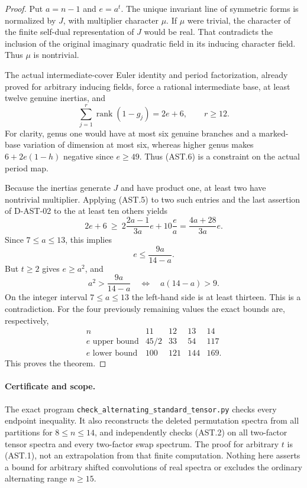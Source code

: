 \begin{proof}
Put $a=n-1$ and $e=a^t$.  The unique invariant line of
symmetric forms is normalized by $J$, with multiplier
character $\mu$.  If $\mu$ were trivial, the character of
the finite self-dual representation of $J$ would be real.
That contradicts the inclusion of the original imaginary
quadratic field in its inducing character field.  Thus
$\mu$ is nontrivial.

The actual intermediate-cover Euler identity and period
factorization, already proved for arbitrary inducing fields,
force a rational intermediate base, at least twelve genuine
inertias, and
\[
                 \sum_{j=1}^r\operatorname{rank}(1-g_j)
                           =2e+6,\qquad r\ge12.             \tag{AST.6}
\]
For clarity, genus one would have at most six genuine
branches and a marked-base variation of dimension at most
six, whereas higher genus makes
$6+2e(1-h)$ negative since $e\ge49$.  Thus (AST.6) is a
constraint on the actual period map.

Because the inertias generate $J$ and have product one,
at least two have nontrivial multiplier.  Applying (AST.5)
to two such entries and the last assertion of D-AST-02
to the at least ten others yields
\[
 2e+6\ \ge\ 2\frac{2a-1}{3a}e+10\frac ea
             =\frac{4a+28}{3a}e.
\]
Since $7\le a\le13$, this implies
\[
                          e\le\frac{9a}{14-a}.              \tag{AST.7}
\]
But $t\ge2$ gives $e\ge a^2$, and
\[
              a^2>\frac{9a}{14-a}
             \quad\Longleftrightarrow\quad a(14-a)>9.
\]
On the integer interval $7\le a\le13$ the left-hand
side is at least thirteen.  This is a contradiction.
For the four previously remaining values the exact bounds
are, respectively,
\[
\begin{array}{c|rrrr}
n&11&12&13&14\\\hline
e\text{ upper bound}&45/2&33&54&117\\
e\text{ lower bound}&100&121&144&169.
\end{array}
\]
This proves the theorem.
\end{proof}

\paragraph{Certificate and scope.}
The exact program \texttt{check\_alternating\_standard\_tensor.py}
checks every endpoint inequality.  It also reconstructs the
deleted permutation spectra from all partitions for
$8\le n\le14$, and independently checks (AST.2) on all
two-factor tensor spectra and every two-factor swap spectrum.
The proof for arbitrary $t$ is (AST.1), not an extrapolation
from that finite computation.  Nothing here asserts a bound
for arbitrary shifted convolutions of real spectra or excludes
the ordinary alternating range $n\ge15$.
